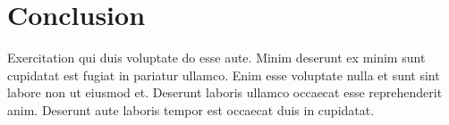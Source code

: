 
\chapter{Conclusion} \label{ch:conclusion}

Exercitation qui duis voluptate do esse aute. Minim deserunt ex minim sunt cupidatat est fugiat in pariatur ullamco. Enim esse voluptate nulla et sunt sint labore non ut eiusmod et. Deserunt laboris ullamco occaecat esse reprehenderit anim. Deserunt aute laboris tempor est occaecat duis in cupidatat.
